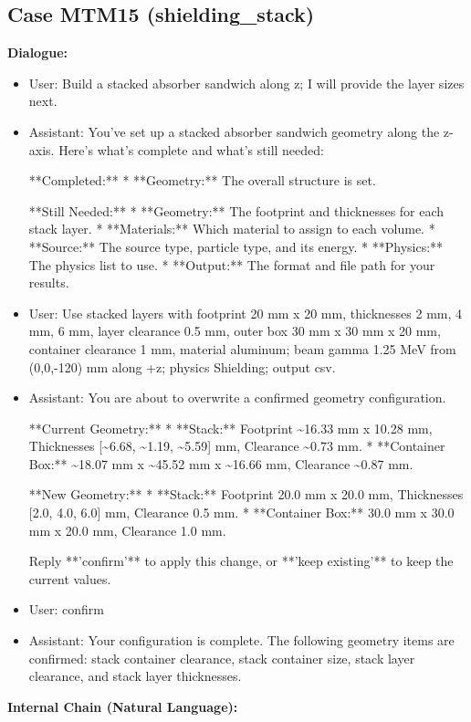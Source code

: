 \documentclass[11pt]{ctexart}
\begin{document}
\subsection{Case MTM15 (shielding\_stack)}
\textbf{Dialogue:}
\begin{itemize}
\item User: Build a stacked absorber sandwich along z; I will provide the layer sizes next.
\item Assistant: You've set up a stacked absorber sandwich geometry along the z-axis. Here's what's complete and what's still needed:

**Completed:**
*   **Geometry:** The overall structure is set.

**Still Needed:**
*   **Geometry:** The footprint and thicknesses for each stack layer.
*   **Materials:** Which material to assign to each volume.
*   **Source:** The source type, particle type, and its energy.
*   **Physics:** The physics list to use.
*   **Output:** The format and file path for your results.
\item User: Use stacked layers with footprint 20 mm x 20 mm, thicknesses 2 mm, 4 mm, 6 mm, layer clearance 0.5 mm, outer box 30 mm x 30 mm x 20 mm, container clearance 1 mm, material aluminum; beam gamma 1.25 MeV from (0,0,-120) mm along +z; physics Shielding; output csv.
\item Assistant: You are about to overwrite a confirmed geometry configuration.

**Current Geometry:**
*   **Stack:** Footprint \textasciitilde{}16.33 mm x 10.28 mm, Thicknesses [\textasciitilde{}6.68, \textasciitilde{}1.19, \textasciitilde{}5.59] mm, Clearance \textasciitilde{}0.73 mm.
*   **Container Box:** \textasciitilde{}18.07 mm x \textasciitilde{}45.52 mm x \textasciitilde{}16.66 mm, Clearance \textasciitilde{}0.87 mm.

**New Geometry:**
*   **Stack:** Footprint 20.0 mm x 20.0 mm, Thicknesses [2.0, 4.0, 6.0] mm, Clearance 0.5 mm.
*   **Container Box:** 30.0 mm x 30.0 mm x 20.0 mm, Clearance 1.0 mm.

Reply **'confirm'** to apply this change, or **'keep existing'** to keep the current values.
\item User: confirm
\item Assistant: Your configuration is complete. The following geometry items are confirmed: stack container clearance, stack container size, stack layer clearance, and stack layer thicknesses.
\end{itemize}
\textbf{Internal Chain (Natural Language):}
\end{document}
